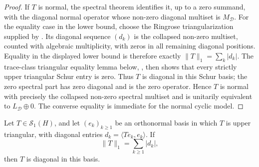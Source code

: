 \begin{proof}
  If \(T\) is normal, the spectral theorem identifies it, up to a zero
  summand, with the diagonal normal operator whose non-zero diagonal multiset is
  \(M_{\mathcal D}\).  For the equality case in the lower bound, choose the
  Ringrose triangularization supplied by
  .  Its
  diagonal sequence \((d_k)\) is the collapsed non-zero multiset, counted with
  algebraic multiplicity, with zeros in all remaining diagonal positions.
  Equality in the displayed lower bound is therefore exactly
  \(\|T\|_1=\sum_k |d_k|\).  The trace-class triangular equality lemma below,
  , then shows that every
  strictly upper triangular Schur entry is zero.  Thus \(T\) is diagonal in
  this Schur basis; the zero spectral part has zero diagonal and is the zero
  operator.  Hence \(T\) is normal with precisely the collapsed non-zero
  spectral multiset and is unitarily equivalent to
  \(L_{\mathcal D}\oplus0\).  The converse equality is immediate for the
  normal cyclic model.
\end{proof}

\begin{lemma}
  \label{lem:trace-class-triangular-equality-pinching}
  Let \(T\in\mathcal S_1(H)\), and let \((e_k)_{k\ge1}\) be an orthonormal
  basis in which \(T\) is upper triangular, with diagonal entries
  \(d_k=\langle Te_k,e_k\rangle\).  If
  \[
    \|T\|_1=\sum_{k\ge1}|d_k|,
  \]
  then \(T\) is diagonal in this basis.
\end{lemma}

